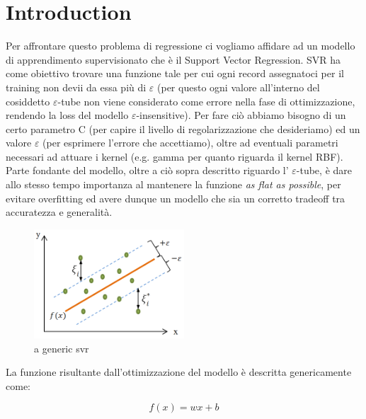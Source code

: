 \documentclass[12pt]{article}
\begin{document}
	\section{Introduction}
Per affrontare questo problema di regressione ci vogliamo affidare ad un modello di apprendimento supervisionato che è il Support Vector Regression. SVR ha come obiettivo trovare una funzione tale per cui ogni record assegnatoci per il training non devii da essa più di  $\varepsilon$  (per questo ogni valore all’interno del cosiddetto $\varepsilon$-tube non viene considerato come errore nella fase di ottimizzazione, rendendo la loss del modello $\varepsilon$-insensitive). Per fare ciò abbiamo bisogno di un certo parametro C (per capire il livello di regolarizzazione che desideriamo) ed un valore $\varepsilon$ (per esprimere l’errore che accettiamo), oltre ad eventuali parametri necessari ad attuare i kernel (e.g. gamma per quanto riguarda il kernel RBF). Parte fondante del modello, oltre a ciò sopra descritto riguardo l’ $\varepsilon$-tube, è dare allo stesso tempo importanza al mantenere la funzione \textit{as flat as possible}, per evitare overfitting ed avere dunque un modello che sia un corretto tradeoff tra accuratezza e generalità.
	\begin{figure}[h]
		\centering
		\includegraphics[width=0.5\textwidth]{svrIntro}
		\caption{a generic svr}
		\label{fig:svr_intro}
	\end{figure}

La funzione risultante dall’ottimizzazione del modello è descritta genericamente come:

	\begin{equation}\label{eq:0}
		f(x) = w  x + b
	\end{equation}
\end{document}
